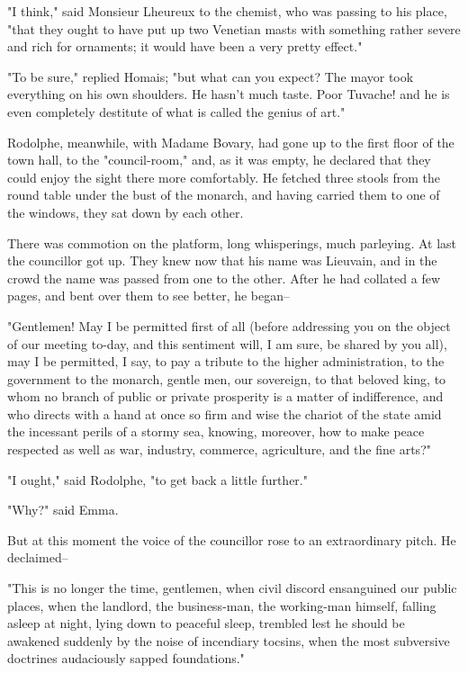 \documentclass[11pt,twocolumn]{ltugboat}
\begin{document}
"I think," said Monsieur Lheureux to the chemist, who was passing to his
place, "that they ought to have put up two Venetian masts with something
rather severe and rich for ornaments; it would have been a very pretty
effect."

"To be sure," replied Homais; "but what can you expect? The mayor took
everything on his own shoulders. He hasn't much taste. Poor Tuvache! and
he is even completely destitute of what is called the genius of art."

Rodolphe, meanwhile, with Madame Bovary, had gone up to the first
floor of the town hall, to the "council-room," and, as it was empty,
he declared that they could enjoy the sight there more comfortably. He
fetched three stools from the round table under the bust of the monarch,
and having carried them to one of the windows, they sat down by each
other.

There was commotion on the platform, long whisperings, much parleying.
At last the councillor got up. They knew now that his name was Lieuvain,
and in the crowd the name was passed from one to the other. After he had
collated a few pages, and bent over them to see better, he began--

"Gentlemen! May I be permitted first of all (before addressing you on
the object of our meeting to-day, and this sentiment will, I am sure, be
shared by you all), may I be permitted, I say, to pay a tribute to the
higher administration, to the government to the monarch, gentle men, our
sovereign, to that beloved king, to whom no branch of public or private
prosperity is a matter of indifference, and who directs with a hand at
once so firm and wise the chariot of the state amid the incessant perils
of a stormy sea, knowing, moreover, how to make peace respected as well
as war, industry, commerce, agriculture, and the fine arts?"

"I ought," said Rodolphe, "to get back a little further."

"Why?" said Emma.

But at this moment the voice of the councillor rose to an extraordinary
pitch. He declaimed--

"This is no longer the time, gentlemen, when civil discord ensanguined
our public places, when the landlord, the business-man, the working-man
himself, falling asleep at night, lying down to peaceful sleep, trembled
lest he should be awakened suddenly by the noise of incendiary tocsins,
when the most subversive doctrines audaciously sapped foundations."
\end{document}
